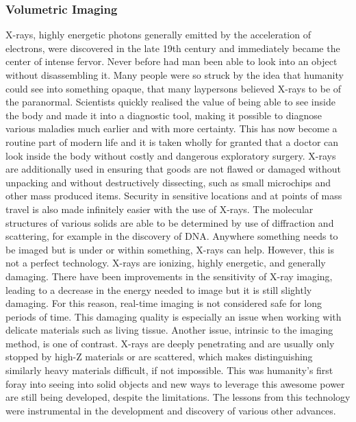 \subsubsection{Volumetric Imaging}
X-rays, highly energetic photons generally emitted by the acceleration of electrons, were discovered in the late 19th century and immediately became the center of intense fervor. Never before had man been able to look into an object without disassembling it. Many people were so struck by the idea that humanity could see into something opaque, that many laypersons believed X-rays to be of the paranormal. Scientists quickly realised the value of being able to see inside the body and made it into a diagnostic tool, making it possible to diagnose various maladies much earlier and with more certainty. This has now become a routine part of modern life and it is taken wholly for granted that a doctor can look inside the body without costly and dangerous exploratory surgery. X-rays are additionally used in ensuring that goods are not flawed or damaged without unpacking and without destructively dissecting, such as small microchips and other mass produced items. Security in sensitive locations and at points of mass travel is also made infinitely easier with the use of X-rays. The molecular structures of various solids are able to be determined by use of diffraction and scattering, for example in the discovery of DNA. Anywhere something needs to be imaged but is under or within something, X-rays can help. However, this is not a perfect technology. X-rays are ionizing, highly energetic, and generally damaging. There have been improvements in the sensitivity of X-ray imaging, leading to a decrease in the energy needed to image but it is still slightly damaging. For this reason, real-time imaging is not considered safe for long periods of time. This damaging quality is especially an issue when working with delicate materials such as living tissue. Another issue, intrinsic to the imaging method, is one of contrast. X-rays are deeply penetrating and are usually only stopped by high-Z materials or are scattered, which makes distinguishing similarly heavy materials difficult, if not impossible. This was humanity's first foray into seeing into solid objects and new ways to leverage this awesome power are still being developed, despite the limitations. The lessons from this technology were instrumental in the development and discovery of various other advances.\\

